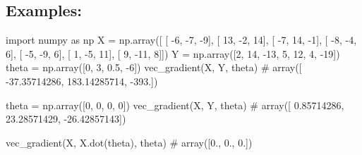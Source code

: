 \documentclass[]{article}
\newenvironment{Shaded}{\begin{snugshade}}{\end{snugshade}}
\newcommand{\CommentTok}[1]{\textcolor[rgb]{0.48,0.49,0.49}{#1}}
\newcommand{\DecValTok}[1]{\textcolor[rgb]{0.96,0.45,0.00}{#1}}
\newcommand{\FloatTok}[1]{\textcolor[rgb]{0.96,0.45,0.00}{#1}}
\newcommand{\ImportTok}[1]{\textcolor[rgb]{0.15,0.68,0.38}{#1}}
\newcommand{\NormalTok}[1]{\textcolor[rgb]{0.81,0.81,0.76}{#1}}
\newcommand{\OperatorTok}[1]{\textcolor[rgb]{0.81,0.81,0.76}{#1}}
\begin{document}
\hypertarget{examples-9}{%
\subsection{Examples:}\label{examples-9}}

\begin{Shaded}
\begin{Highlighting}[]
\ImportTok{import}\NormalTok{ numpy }\ImportTok{as}\NormalTok{ np}
\NormalTok{X }\OperatorTok{=}\NormalTok{ np.array([}
\NormalTok{    [ }\DecValTok{-6}\NormalTok{,  }\DecValTok{-7}\NormalTok{,  }\DecValTok{-9}\NormalTok{],}
\NormalTok{        [ }\DecValTok{13}\NormalTok{,  }\DecValTok{-2}\NormalTok{,  }\DecValTok{14}\NormalTok{],}
\NormalTok{        [ }\DecValTok{-7}\NormalTok{,  }\DecValTok{14}\NormalTok{,  }\DecValTok{-1}\NormalTok{],}
\NormalTok{        [ }\DecValTok{-8}\NormalTok{,  }\DecValTok{-4}\NormalTok{,   }\DecValTok{6}\NormalTok{],}
\NormalTok{        [ }\DecValTok{-5}\NormalTok{,  }\DecValTok{-9}\NormalTok{,   }\DecValTok{6}\NormalTok{],}
\NormalTok{        [  }\DecValTok{1}\NormalTok{,  }\DecValTok{-5}\NormalTok{,  }\DecValTok{11}\NormalTok{],}
\NormalTok{        [  }\DecValTok{9}\NormalTok{, }\DecValTok{-11}\NormalTok{,   }\DecValTok{8}\NormalTok{]])}
\NormalTok{Y }\OperatorTok{=}\NormalTok{ np.array([}\DecValTok{2}\NormalTok{, }\DecValTok{14}\NormalTok{, }\DecValTok{-13}\NormalTok{, }\DecValTok{5}\NormalTok{, }\DecValTok{12}\NormalTok{, }\DecValTok{4}\NormalTok{, }\DecValTok{-19}\NormalTok{])}
\NormalTok{theta }\OperatorTok{=}\NormalTok{ np.array([}\DecValTok{0}\NormalTok{, }\DecValTok{3}\NormalTok{, }\FloatTok{0.5}\NormalTok{, }\DecValTok{-6}\NormalTok{])}
\NormalTok{vec_gradient(X, Y, theta)}
\CommentTok{# array([ -37.35714286, 183.14285714, -393.])}

\NormalTok{theta }\OperatorTok{=}\NormalTok{ np.array([}\DecValTok{0}\NormalTok{, }\DecValTok{0}\NormalTok{, }\DecValTok{0}\NormalTok{, }\DecValTok{0}\NormalTok{])}
\NormalTok{vec_gradient(X, Y, theta)}
\CommentTok{# array([  0.85714286, 23.28571429, -26.42857143])}

\NormalTok{vec_gradient(X, X.dot(theta), theta)}
\CommentTok{# array([0., 0., 0.])}
\end{Highlighting}
\end{Shaded}

\clearpage
\end{document}
